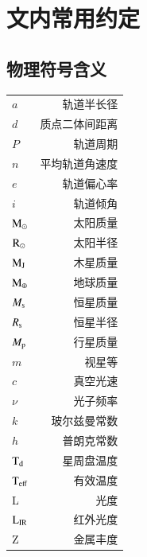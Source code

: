 
\chapter{文内常用约定} \label{apdx:nomenclature}
\section{物理符号含义} \label{apdx:symbol}
\begin{multicols}{2}
\begin{tabularx}{0.85\linewidth}{@{\extracolsep{\fill}}lr}
\centering
$a$      	     			&     轨道半长径 		\\
$d$      	     			&     质点二体间距离	 	\\
$P$      	     			&     轨道周期	 		\\
$n$      	     			&     平均轨道角速度	 	\\
$e$      	     			&     轨道偏心率 		\\
$i$          	     			&     轨道倾角 			\\
$\mathrm{M}_\odot$          		&     太阳质量   			\\
$\mathrm{R}_\odot$          		&     太阳半径   			\\
$\mathrm{M}_\mathrm{J}$          		&     木星质量   			\\
$\mathrm{M}_\oplus$          	&     地球质量   			\\
$M_\mathrm{s}$          		&     恒星质量   			\\
$R_\mathrm{s}$          		&     恒星半径   			\\
$M_\mathrm{p}$         	 	&     行星质量   			\\
$m$         	 			&     视星等   			\\
$c$         	 			&     真空光速   			\\
$\nu$         	 		&     光子频率   			\\
$k$         	 			&     玻尔兹曼常数   		\\
$h$         	 			&     普朗克常数   		\\
$\mathrm{T}_\mathrm{d}$         	 	&     星周盘温度   		\\
$\mathrm{T}_\mathrm{eff}$         	 	&     有效温度 	  		\\
L		         	 	&     光度				\\
$\mathrm{L}_\mathrm{IR}$         	 	&      红外光度   		\\
Z		       	 		&      金属丰度   		\\


\end{tabularx}
\end{multicols}
